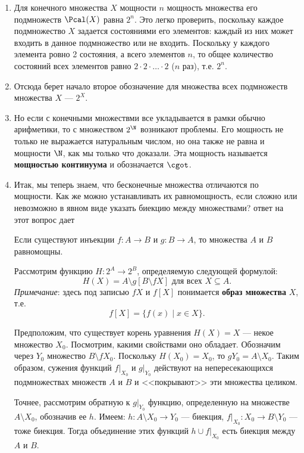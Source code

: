 \begin{enumerate}
\item Для конечного множества $X$ мощности $n$ мощность множества его подмножеств $\Pcal(X)$ равна $2^n$. Это легко проверить, поскольку каждое подмножество $X$ задается состояниями его элементов: каждый из них может входить в данное подмножество или не входить. Поскольку у каждого элемента ровно 2 состояния, а всего элементов $n$, то общее количество состояний всех элементов равно $2\cdot 2\cdot\ldots\cdot 2$ ($n$ раз), т.е. $2^n$.
\item Отсюда берет начало второе обозначение для множества всех подмножеств множества $X$ --- $2^X$.
\item Но если с конечными множествми все укладывается в рамки обычно арифметики, то с множеством $2^\N$ возникают проблемы. Его мощность не только не выражается натуральным числом, но она также не равна и мощности $\N$, как мы только что доказали. Эта мощность называется \textbf{мощностью континуума} и обозначается $\cgot$.
\item Итак, мы теперь знаем, что бесконечные множества отличаются по мощности. Как же можно устанавливать их равномощность, если сложно или невозможно в явном виде указать биекцию между множествами? ответ на этот вопрос дает
\begin{thrm}
Если существуют инъекции $f:A\to B$ и $g:B\to A$, то множества $A$ и $B$ равномощны.
\end{thrm}
\pf Рассмотрим функцию $H:2^A\to 2^B$, определяемую следующей формулой:
\[H(X)=A\setminus g[B\setminus fX]\mbox{ для всех }X\subseteq A.\]
\textit{Примечание}: здесь под записью $fX$ и $f[X]$ понимается \textbf{образ множества} $X$, т.е.
$$
f[X] = \{f(x)\mid x\in X\}.
$$

Предположим, что существует корень уравнения $H(X)=X$ --- некое множество $X_0$.
Посмотрим, какими свойствами оно обладает. Обозначим через $Y_0$ множество
$B\setminus fX_0$. Поскольку $H(X_0)=X_0$, то $gY_0=A\setminus X_0$. Таким
образом, сужения функций $f|_{X_0}$ и $g|_{Y_0}$ действуют на непересекающихся
подмножествах множеств $A$ и $B$ и <<покрывают>> эти множества
целиком.

Точнее, рассмотрим обратную к $g|_{Y_0}$ функцию, определенную на множестве
$A\setminus X_0$, обозначив ее $h$. Имеем: $h:A\setminus X_0\to Y_0$ ---
биекция, $f|_{X_0}:X_0\to B\setminus Y_0$ --- тоже биекция. Тогда объединение
этих функций $h\cup f|_{X_0}$ есть биекция между $A$ и $B$.


\end{enumerate}
